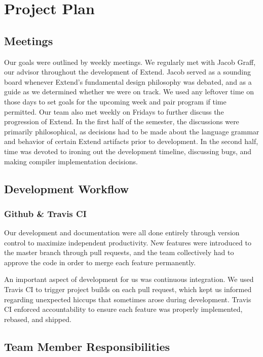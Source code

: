\chapter{Project Plan}

\section{Meetings}
Our goals were outlined by weekly meetings. We regularly met with Jacob Graff, our advisor throughout the development of Extend.
Jacob served as a sounding board whenever Extend's fundamental design philosophy was debated, and as a guide as we determined whether we were on track. We used any leftover time on those days to set goals for the upcoming week and pair program if time permitted.
\newline \newline
Our team also met weekly on Fridays to further discuss the progression of Extend. In the first half of the semester, the discussions were primarily philosophical, as decisions had to be made about the language grammar and behavior of certain Extend artifacts prior to development. In the second half, time was devoted to ironing out the development timeline, discussing bugs, and making compiler implementation decisions.

\section{Development Workflow}

  \subsection{Github \& Travis CI}
  Our development and documentation were all done entirely through version control to maximize independent productivity.
  New features were introduced to the master branch through pull requests, and the team collectively had to approve the code in order to merge each feature permanently.

  \medskip \noindent
  An important aspect of development for us was continuous integration. We used Travis CI to trigger project builds on each pull request, which kept us informed regarding unexpected hiccups that sometimes arose during development. Travis CI enforced accountability to ensure each feature was properly implemented, rebased, and shipped.

\section{Team Member Responsibilities}

